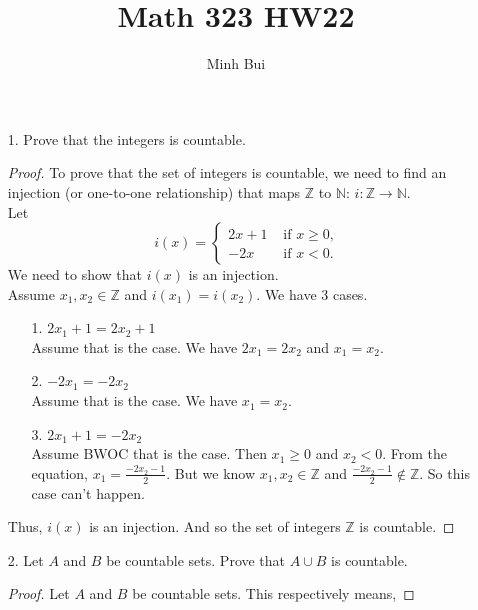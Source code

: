 \documentclass{article}
\author{Minh Bui}
\title{Math 323 HW22}
\theoremstyle{claim}
\theoremstyle{definition}
\begin{document}
\maketitle
\begin{enumerate}
    \item[1.] Prove that the integers is countable.
        \begin{proof}
            To prove that the set of integers is countable, we need to find an injection (or one-to-one relationship) that maps $\mathbb{Z}$ to $\mathbb{N}$: $i: \mathbb{Z} \rightarrow \mathbb{N}$.\\
            Let
            \begin{equation*}
            i(x) = \left\{
                \begin{array}{rl}
                    2x + 1 & \text{ if } x \ge 0,\\
                    -2x & \text{ if } x < 0.
                \end{array} \right.
            \end{equation*}
            We need to show that $i(x)$ is an injection.\\
            Assume $x_1, x_2 \in \mathbb{Z}$ and $i(x_1) = i(x_2)$. We have 3 cases.
            \begin{enumerate}
                \item[1.] $2x_1 + 1 = 2x_2 + 1$\\
                    Assume that is the case. We have $2x_1  = 2x_2$ and $x_1 = x_2$.
                \item[2.] $-2x_1 = -2x_2$\\
                    Assume that is the case. We have $x_1 = x_2$.
                \item[3.] $2x_1 + 1 = -2x_2$\\
                    Assume BWOC that is the case. Then $x_1 \ge 0$ and $x_2 < 0$. From the equation, $x_1 = \frac{-2x_2 -1}{2}$. But we know $x_1, x_2 \in \mathbb{Z}$ and $\frac{-2x_2 - 1}{2} \notin \mathbb{Z}$. So this case can't happen.
            \end{enumerate}
            Thus, $i(x)$ is an injection. And so the set of integers $\mathbb{Z}$ is countable.
        \end{proof}
    \item[2.] Let $A$ and $B$ be countable sets. Prove that $A \cup B$ is countable.
    \begin{proof}
        Let $A$ and $B$ be countable sets. This respectively means,

\end{proof}
\end{enumerate}
\end{document}

